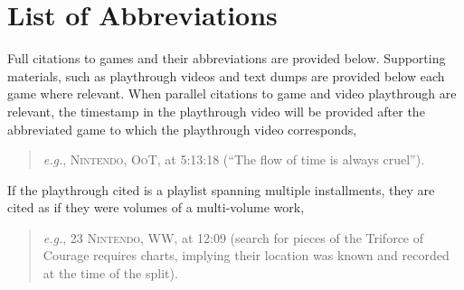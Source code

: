 \documentclass[./FGP.tex]{subfiles}
\begin{document}
  \section*{List of Abbreviations}
  Full citations to games and their abbreviations are provided below. Supporting materials, such as playthrough videos and text dumps are provided below each game where relevant. When parallel citations to game and video playthrough are relevant, the timestamp in the playthrough video will be provided after the abbreviated game to which the playthrough video corresponds, \begin{quote}
  \textit{e.g.}, \textsc{Nintendo, OoT}, at 5:13:18 (``The flow of time is always cruel'').
  \end{quote} If the playthrough cited is a playlist spanning multiple installments, they are cited as if they were volumes of a multi-volume work, \begin{quote}
  \textit{e.g.}, 23 \textsc{Nintendo, WW}, at 12:09 (search for pieces of the Triforce of Courage requires charts, implying their location was known and recorded at the time of the split).\end{quote}
\end{document}
